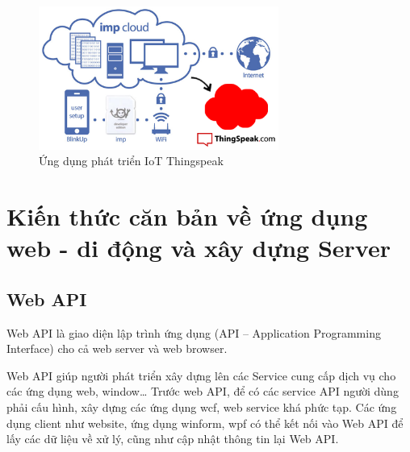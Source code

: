 \begin{figure}[H] 
\centering    
\includegraphics[width=0.7\textwidth]{thingspeak}
\caption[Ứng dụng phát triển IoT Thingspeak]{Ứng dụng phát triển IoT Thingspeak}
\label{fig:thingspeak}
\end{figure}

\section{Kiến thức căn bản về ứng dụng web - di động và xây dựng Server}

\subsection{Web API} 

Web API là giao diện lập trình ứng dụng (API – Application Programming Interface) cho cả web server và web browser.\cite{c2api}

Web API giúp người phát triển xây dựng lên các Service cung cấp dịch vụ cho các ứng dụng web, window… Trước web API, để có các service API người dùng phải cấu hình, xây dựng các ứng dụng wcf, web service khá phức tạp. Các ứng dụng client như website, ứng dụng winform, wpf có thể kết nối vào Web API để lấy các dữ liệu về xử lý, cũng như cập nhật thông tin lại Web API.

